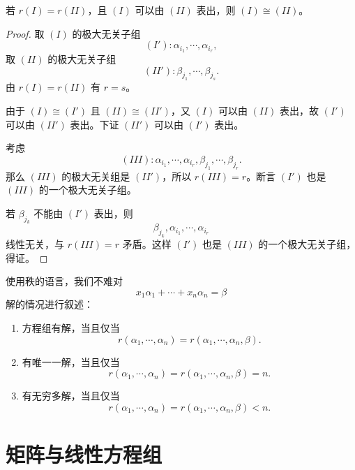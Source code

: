 \begin{proposition}
	若 $r(I)=r(II)$，且 $(I)$ 可以由 $(II)$ 表出，则 $(I)\cong(II)$。
\end{proposition}
\begin{proof}
	取 $(I)$ 的极大无关子组
	\[
	(I'):\alpha_{i_1},\cdots,\alpha_{i_r},
	\]
	取 $(II)$ 的极大无关子组
	\[
	(II'):\beta_{j_1},\cdots,\beta_{j_s}.
	\]
	由 $r(I)=r(II)$ 有 $r=s$。

	由于 $(I)\cong(I')$ 且 $(II)\cong(II')$，又 $(I)$ 可以由 $(II)$ 表出，故 $(I')$ 可以由 $(II')$ 表出。下证 $(II')$ 可以由 $(I')$ 表出。

	考虑
	\[
	(III):\alpha_{i_1},\cdots,\alpha_{i_r},\beta_{j_1},\cdots,\beta_{j_r}.
	\]
	那么 $(III)$ 的极大无关组是 $(II')$，所以 $r(III)=r$。断言 $(I')$ 也是 $(III)$ 的一个极大无关子组。

	若 $\beta_{j_k}$ 不能由 $(I')$ 表出，则
	\[
	\beta_{j_k},\alpha_{i_1},\cdots,\alpha_{i_r}
	\]
	线性无关，与 $r(III)=r$ 矛盾。这样 $(I')$ 也是 $(III)$ 的一个极大无关子组，得证。
\end{proof}

使用秩的语言，我们不难对
\[
x_1\alpha_1+\cdots+x_n\alpha_n=\beta
\]
解的情况进行叙述：
\begin{enumerate}
	\item 方程组有解，当且仅当
	\[
	r(\alpha_1,\cdots,\alpha_n)
	=
	r(\alpha_1,\cdots,\alpha_n,\beta).
	\]
	\item 有唯一一解，当且仅当
	\[
	r(\alpha_1,\cdots,\alpha_n)
	=
	r(\alpha_1,\cdots,\alpha_n,\beta)
	=n.
	\]
	\item 有无穷多解，当且仅当
	\[
	r(\alpha_1,\cdots,\alpha_n)
	=
	r(\alpha_1,\cdots,\alpha_n,\beta)
	<n.
	\]
\end{enumerate}



\section{矩阵与线性方程组}

